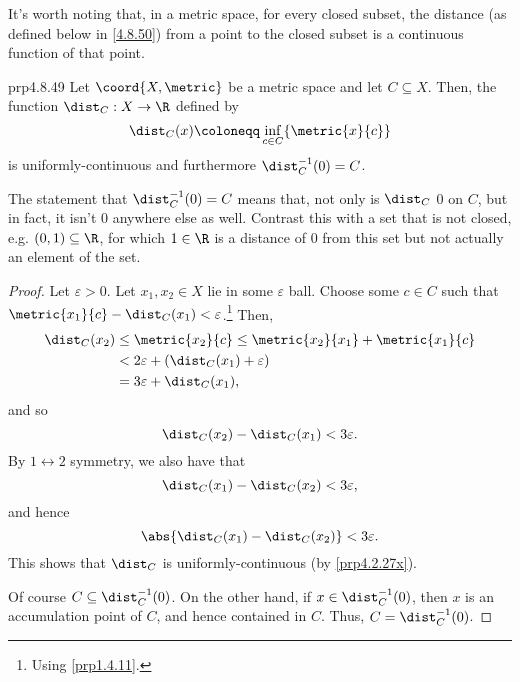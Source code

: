 It's worth noting that, in a metric space, for every closed subset, the distance (as defined below in \eqref{4.8.50}) from a point to the closed subset is a continuous function of that point.
\begin{prp}{}{prp4.8.49}
Let $\coord{X,\metric}$ be a metric space and let $C\subseteq X$.  Then, the function $\dist _C:X\rightarrow \R$ defined by
\begin{equation}\label{4.8.50}
\dist _C(x)\coloneqq \inf _{c\in C}\{ \metric{x}{c}\} 
\end{equation}
is uniformly-continuous and furthermore $\dist _C^{-1}(0)=C$.
\begin{rmk}
The statement that $\dist _C^{-1}(0)=C$ means that, not only is $\dist _C$ $0$ on $C$, but in fact, it isn't $0$ anywhere else as well.  Contrast this with a set that is not closed, e.g. $(0,1)\subseteq \R$, for which $1\in \R$ is a distance of $0$ from this set but not actually an element of the set.
\end{rmk}
\begin{proof}
Let $\varepsilon >0$.  Let $x_1,x_2\in X$ lie in some $\varepsilon$ ball.  Choose some $c\in C$ such that $\metric{x_1}{c}-\dist_C(x_1)<\varepsilon$.\footnote{Using \cref{prp1.4.11}.}  Then,
\begin{equation}
\begin{split}
\dist _C(x_2) & \leq \metric{x_2}{c}\leq \metric{x_2}{x_1}+\metric{x_1}{c} \\
& <2\varepsilon +(\dist _C(x_1)+\varepsilon ) \\
& =3\varepsilon +\dist _C(x_1),
\end{split}
\end{equation}
and so
\begin{equation}
\dist _C(x_2)-\dist _C(x_1)<3\varepsilon .
\end{equation}
By $1\leftrightarrow 2$ symmetry, we also have that
\begin{equation}
\dist _C(x_1)-\dist _C(x_2)<3\varepsilon ,
\end{equation}
and hence
\begin{equation}
\abs{\dist _C(x_1)-\dist _C(x_2)}<3\varepsilon .
\end{equation}
This shows that $\dist _C$ is uniformly-continuous (by \cref{prp4.2.27x}).

Of course $C\subseteq \dist _C^{-1}(0)$.  On the other hand, if $x\in \dist _C^{-1}(0)$, then $x$ is an accumulation point of $C$, and hence contained in $C$.  Thus, $C=\dist _C^{-1}(0)$.
\end{proof}
\end{prp}

